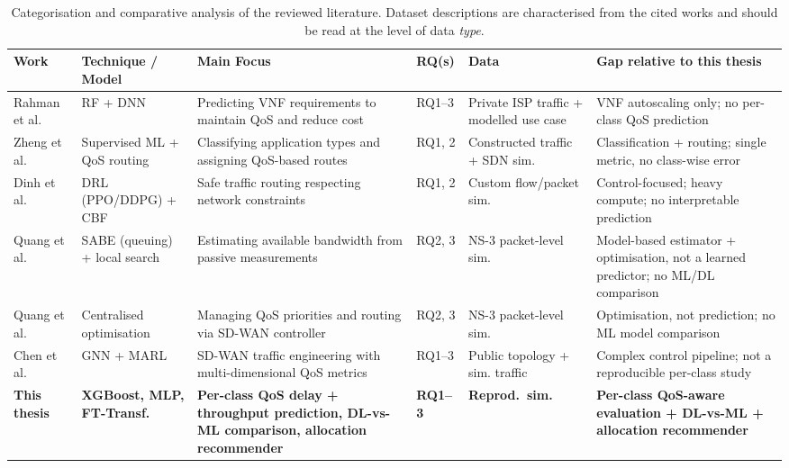 \documentclass[a4paper,12pt]{Classes/RoboticsLaTeX}
\begin{document}
\begin{table}[H]
\centering
\caption[Categorisation and comparative analysis of the reviewed literature]{Categorisation and comparative analysis of the reviewed literature. Dataset descriptions are characterised from the cited works and should be read at the level of data \emph{type}.}
\label{tab:lit-comparison}
\begingroup
\scriptsize
\setlength{\tabcolsep}{3pt}
\begin{tabular}{|p{1.7cm}|p{2.0cm}|p{2.5cm}|p{1.0cm}|p{1.8cm}|p{2.9cm}|}
\hline
\textbf{Work} & \textbf{Technique / Model} & \textbf{Main Focus} & \textbf{RQ(s)} & \textbf{Data} & \textbf{Gap relative to this thesis} \\
\hline
Rahman et al.~\cite{rahman2019autoscaling} & RF + DNN & Predicting VNF requirements to maintain QoS and reduce cost & RQ1--3 & Private ISP traffic + modelled use case & VNF autoscaling only; no per-class QoS prediction \\
\hline
Zheng et al.~\cite{zheng2022applicationaware} & Supervised ML + QoS routing & Classifying application types and assigning QoS-based routes & RQ1, 2 & Constructed traffic + SDN sim. & Classification + routing; single metric, no class-wise error \\
\hline
Dinh et al.~\cite{dinh2024safeloadbalancing} & DRL (PPO/DDPG) + CBF & Safe traffic routing respecting network constraints & RQ1, 2 & Custom flow/packet sim. & Control-focused; heavy compute; no interpretable prediction \\
\hline
Quang et al.~\cite{quang2023globalqos} & SABE (queuing) + local search & Estimating available bandwidth from passive measurements & RQ2, 3 & NS-3 packet-level sim. & Model-based estimator + optimisation, not a learned predictor; no ML/DL comparison \\
\hline
Quang et al.~\cite{quang2022routing} & Centralised optimisation & Managing QoS priorities and routing via SD-WAN controller & RQ2, 3 & NS-3 packet-level sim. & Optimisation, not prediction; no ML model comparison \\
\hline
Chen et al.~\cite{chen2025mteal} & GNN + MARL & SD-WAN traffic engineering with multi-dimensional QoS metrics & RQ1--3 & Public topology + sim. traffic & Complex control pipeline; not a reproducible per-class study \\
\hline
\textbf{This thesis} & \textbf{XGBoost, MLP, FT-Transf.} & \textbf{Per-class QoS delay + throughput prediction, DL-vs-ML comparison, allocation recommender} & \textbf{RQ1--3} & \textbf{Reprod.\ sim.} & \textbf{Per-class QoS-aware evaluation + DL-vs-ML + allocation recommender} \\
\hline
\end{tabular}
\endgroup
\end{table}
\end{document}
